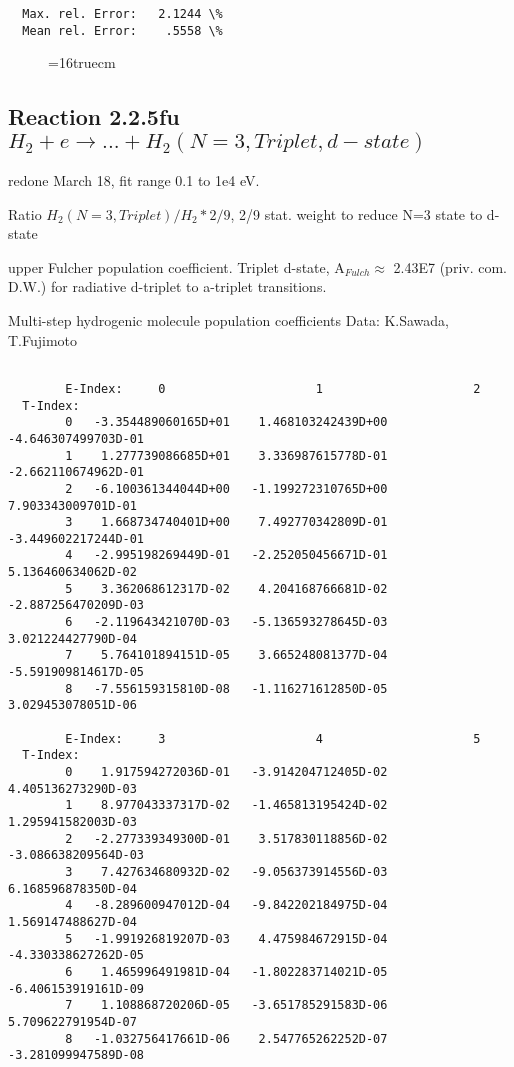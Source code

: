 \documentclass[12pt,dvipdfmx]{article}
\begin{document}
{\begin{small}
\begin{verbatim}
  Max. rel. Error:   2.1244 \%
  Mean rel. Error:    .5558 \%

\end{verbatim}\end{small}
\begin{figure} \label{2.2.5fl}
\epsfxsize=16truecm
\end{figure}
\newpage

\subsection{
Reaction 2.2.5fu $H_2 + e \rightarrow ...+ H_2(N=3,Triplet, d-state)$}
redone March 18, fit range 0.1 to 1e4 eV.

Ratio $H_2(N=3, Triplet)/H_2*2/9 $,  2/9 stat. weight to reduce N=3 state to d-state

upper Fulcher population coefficient. Triplet d-state, A$_{Fulch} \approx $ 2.43E7  (priv. com. D.W.)
for radiative d-triplet to a-triplet transitions.

 Multi-step hydrogenic molecule population coefficients
 Data: K.Sawada, T.Fujimoto \cite{kn:Sawada}
\begin{small}\begin{verbatim}

        E-Index:     0                     1                     2
  T-Index:
        0   -3.354489060165D+01    1.468103242439D+00   -4.646307499703D-01
        1    1.277739086685D+01    3.336987615778D-01   -2.662110674962D-01
        2   -6.100361344044D+00   -1.199272310765D+00    7.903343009701D-01
        3    1.668734740401D+00    7.492770342809D-01   -3.449602217244D-01
        4   -2.995198269449D-01   -2.252050456671D-01    5.136460634062D-02
        5    3.362068612317D-02    4.204168766681D-02   -2.887256470209D-03
        6   -2.119643421070D-03   -5.136593278645D-03    3.021224427790D-04
        7    5.764101894151D-05    3.665248081377D-04   -5.591909814617D-05
        8   -7.556159315810D-08   -1.116271612850D-05    3.029453078051D-06

        E-Index:     3                     4                     5
  T-Index:
        0    1.917594272036D-01   -3.914204712405D-02    4.405136273290D-03
        1    8.977043337317D-02   -1.465813195424D-02    1.295941582003D-03
        2   -2.277339349300D-01    3.517830118856D-02   -3.086638209564D-03
        3    7.427634680932D-02   -9.056373914556D-03    6.168596878350D-04
        4   -8.289600947012D-04   -9.842202184975D-04    1.569147488627D-04
        5   -1.991926819207D-03    4.475984672915D-04   -4.330338627262D-05
        6    1.465996491981D-04   -1.802283714021D-05   -6.406153919161D-09
        7    1.108868720206D-05   -3.651785291583D-06    5.709622791954D-07
        8   -1.032756417661D-06    2.547765262252D-07   -3.281099947589D-08


\end{verbatim}
\end{small}}
\end{document}
